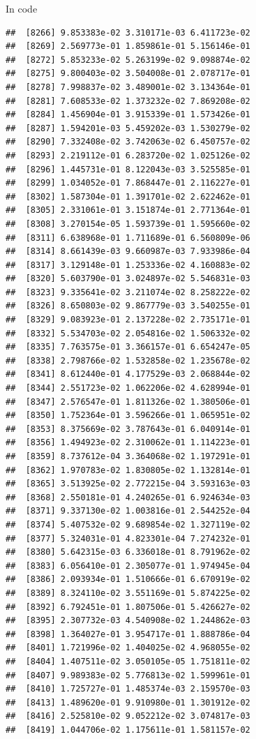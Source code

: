 \documentclass[ignorenonframetext,]{beamer}
\begin{document}
\begin{frame}[fragile]{In code}
\begin{verbatim}
##  [8266] 9.853383e-02 3.310171e-03 6.411723e-02
##  [8269] 2.569773e-01 1.859861e-01 5.156146e-01
##  [8272] 5.853233e-02 5.263199e-02 9.098874e-02
##  [8275] 9.800403e-02 3.504008e-01 2.078717e-01
##  [8278] 7.998837e-02 3.489001e-02 3.134364e-01
##  [8281] 7.608533e-02 1.373232e-02 7.869208e-02
##  [8284] 1.456904e-01 3.915339e-01 1.573426e-01
##  [8287] 1.594201e-03 5.459202e-03 1.530279e-02
##  [8290] 7.332408e-02 3.742063e-02 6.450757e-02
##  [8293] 2.219112e-01 6.283720e-02 1.025126e-02
##  [8296] 1.445731e-01 8.122043e-03 3.525585e-01
##  [8299] 1.034052e-01 7.868447e-01 2.116227e-01
##  [8302] 1.587304e-01 1.391701e-02 2.622462e-01
##  [8305] 2.331061e-01 3.151874e-01 2.771364e-01
##  [8308] 3.270154e-05 1.593739e-01 1.595660e-02
##  [8311] 6.638968e-01 1.711689e-01 6.560809e-06
##  [8314] 8.661439e-03 9.660987e-03 7.933986e-04
##  [8317] 3.129148e-01 1.253336e-02 4.160883e-02
##  [8320] 5.603790e-01 3.024897e-02 5.546831e-03
##  [8323] 9.335641e-02 3.211074e-02 8.258222e-02
##  [8326] 8.650803e-02 9.867779e-03 3.540255e-01
##  [8329] 9.083923e-01 2.137228e-02 2.735171e-01
##  [8332] 5.534703e-02 2.054816e-02 1.506332e-02
##  [8335] 7.763575e-01 3.366157e-01 6.654247e-05
##  [8338] 2.798766e-02 1.532858e-02 1.235678e-02
##  [8341] 8.612440e-01 4.177529e-03 2.068844e-02
##  [8344] 2.551723e-02 1.062206e-02 4.628994e-01
##  [8347] 2.576547e-01 1.811326e-02 1.380506e-01
##  [8350] 1.752364e-01 3.596266e-01 1.065951e-02
##  [8353] 8.375669e-02 3.787643e-01 6.040914e-01
##  [8356] 1.494923e-02 2.310062e-01 1.114223e-01
##  [8359] 8.737612e-04 3.364068e-02 1.197291e-01
##  [8362] 1.970783e-02 1.830805e-02 1.132814e-01
##  [8365] 3.513925e-02 2.772215e-04 3.593163e-03
##  [8368] 2.550181e-01 4.240265e-01 6.924634e-03
##  [8371] 9.337130e-02 1.003816e-01 2.544252e-04
##  [8374] 5.407532e-02 9.689854e-02 1.327119e-02
##  [8377] 5.324031e-01 4.823301e-04 7.274232e-01
##  [8380] 5.642315e-03 6.336018e-01 8.791962e-02
##  [8383] 6.056410e-01 2.305077e-01 1.974945e-04
##  [8386] 2.093934e-01 1.510666e-01 6.670919e-02
##  [8389] 8.324110e-02 3.551169e-01 5.874225e-02
##  [8392] 6.792451e-01 1.807506e-01 5.426627e-02
##  [8395] 2.307732e-03 4.540908e-02 1.244862e-03
##  [8398] 1.364027e-01 3.954717e-01 1.888786e-04
##  [8401] 1.721996e-02 1.404025e-02 4.968055e-02
##  [8404] 1.407511e-02 3.050105e-05 1.751811e-02
##  [8407] 9.989383e-02 5.776813e-02 1.599961e-01
##  [8410] 1.725727e-01 1.485374e-03 2.159570e-03
##  [8413] 1.489620e-01 9.910980e-01 1.301912e-02
##  [8416] 2.525810e-02 9.052212e-02 3.074817e-03
##  [8419] 1.044706e-02 1.175611e-01 1.581157e-02

\end{verbatim}
\end{frame}
\end{document}

